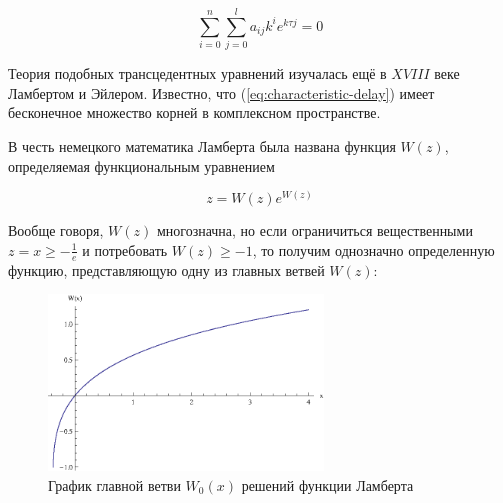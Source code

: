 \begin{equation}\label{eq:characteristic-delay}
\sum\limits_{i=0}^{n} \sum\limits_{j=0}^{l} a_{ij} k^i e^{k \tau j} = 0
\end{equation}

Теория подобных трансцедентных уравнений изучалась ещё в $XVIII$ веке Ламбертом и Эйлером. Известно, что (\ref{eq:characteristic-delay}) имеет бесконечное множество корней в комплексном пространстве.

В честь немецкого математика Ламберта была названа функция $W(z)$, определяемая функциональным уравнением

\begin{equation}
z = W(z) e^{W(z)}
\end{equation}

Вообще говоря, $W(z)$ многозначна, но если ограничиться вещественными $z = x \geq -\frac{1}{e}$ и потребовать $W(z) \geq -1$, то получим однозначно определенную функцию, представляющую одну из главных ветвей $W(z)$:

\begin{figure}
\begin{center}
\includegraphics[width=0.65\textwidth]{./1_modelling/Lambert.eps}
\end{center}
\caption{График главной ветви $W_0(x)$ решений функции Ламберта}
\end{figure}
